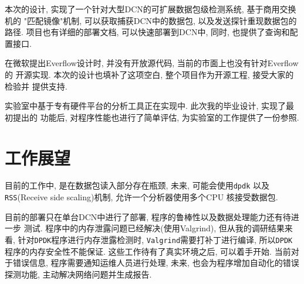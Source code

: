   本次的设计, 实现了一个针对大型DCN的可扩展数据包级检测系统, 基于商用交换机的
"匹配镜像"机制, 可以获取捕获DCN中的数据包, 以及发送探针重现数据包的路径.
项目也有详细的部署文档, 可以快速部署到DCN中, 同时, 也提供了查询和配置接口.

  在微软提出Everflow设计时, 并没有开放源代码, 当前的市面上也没有针对Everflow的
开源实现. 本次的设计也填补了这项空白, 整个项目作为开源工程, 接受大家的检验并
提供支持.

  实验室中基于专有硬件平台的分析工具正在实现中. 此次我的毕业设计, 实现了最初提出的
功能后, 对程序性能也进行了简单评估, 为实验室的工作提供了一份参照.

\section{工作展望}

  目前的工作中, 是在数据包读入部分存在瓶颈, 未来, 可能会使用\texttt{dpdk}
以及\texttt{RSS}(Receive side scaling)\cite{rss}机制, 允许一个分析器使用多个CPU
核接受数据包.

  目前的部署只在单台DCN中进行了部署, 程序的鲁棒性以及数据处理能力还有待进一步
测试. 程序中的内存泄露问题已经解决(使用Valgrind\cite{Valgrind}),
但从我的调研结果来看, 针对\texttt{DPDK}程序进行内存泄露检测时,
\texttt{Valgrind}需要打补丁进行编译, 所以\texttt{DPDK}程序的内存安全性不能保证.
这些工作待有了真实环境之后, 可以着手开始. 当前对于错误信息, 程序需要通知运维人员进行处理,
未来, 也会为程序增加自动化的错误探测功能, 主动解决网络问题并生成报告.
